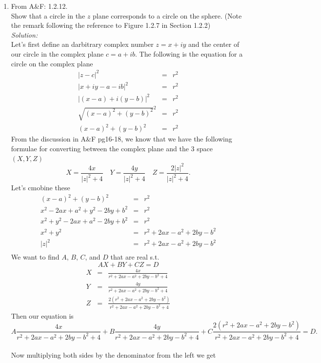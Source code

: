 \documentclass[10pt]{amsart}
\theoremstyle{nonumberplain}
\begin{document}
\begin{enumerate}[label={\bf {\arabic*}:}]
\item From A\&F: 1.2.12. \\
Show that a circle in the $z$ plane corresponds to a circle on the sphere.
(Note the remark following the reference to Figure 1.2.7 in Section 1.2.2)\\
\textit{Solution:} \\
Let's first define an darbitrary complex number $z = x + iy$ and the center of our circle in the complex plane $c = a + ib$.
The following is the equation for a circle on the complex plane
\begin{eqnarray*}
|z - c|^2 &=& r^2 \\
|x + iy - a - ib|^2 &=& r^2 \\
|(x - a) + i(y -b)|^2 &=& r^2 \\
\sqrt{(x - a)^2 + (y - b)^2}^2 &=& r^2 \\
(x - a)^2 + (y - b)^2 &=& r^2
\end{eqnarray*}
From the discussion in A\&F pg16-18, we know that we have the following formulae for converting between the complex plane and the 3 space $(X, Y, Z)$
$$X = \frac{4x}{|z|^2 + 4} \quad Y = \frac{4y}{|z|^2 + 4} \quad Z = \frac{2|z|^2}{|z|^2 + 4}.$$
Let's cmobine these
\begin{eqnarray*}
(x - a)^2 + (y - b)^2 &=& r^2 \\
x^2 -2ax + a^2 + y^2 -2by + b^2 &=& r^2 \\
x^2 + y^2 -2ax + a^2 -2by + b^2 &=& r^2 \\
x^2 + y^2 &=& r^2 +2ax - a^2 +2by - b^2 \\
|z|^2 &=& r^2 +2ax - a^2 +2by - b^2 \\
\end{eqnarray*}
We want to find $A$, $B$, $C$, and $D$ that are real s.t. $$AX + BY + CZ = D$$
\begin{eqnarray*}
X &=& \frac{4x}{r^2 +2ax - a^2 +2by - b^2 + 4} \\
Y &=& \frac{4y}{r^2 +2ax - a^2 +2by - b^2 + 4} \\
Z &=& \frac{2\left(r^2 +2ax - a^2 +2by - b^2\right)}{r^2 +2ax - a^2 +2by - b^2 + 4}
\end{eqnarray*}
Then our equation is
$$ A\frac{4x}{r^2 +2ax - a^2 +2by - b^2 + 4} + B\frac{4y}{r^2 +2ax - a^2 +2by - b^2 + 4} + C\frac{2\left(r^2 +2ax - a^2 +2by - b^2\right)}{r^2 +2ax - a^2 +2by - b^2 + 4} = D.$$ \\
Now multiplying both sides by the denominator from the left we get

\end{enumerate}
\end{document}
